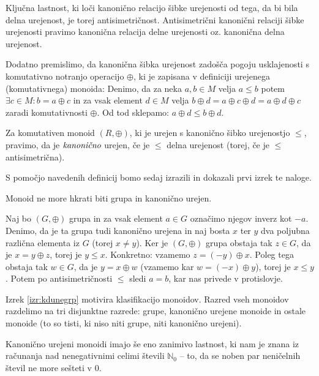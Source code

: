 \documentclass[mat1]{fmfdelo}
\newcommand{\N}{\mathbb{N}}
\newcommand{\No}{\N_0}
\newcommand{\pojem}[1]{\ensuremath{\emph{#1}}}
\begin{document}
Ključna lastnost, ki loči kanonično relacijo šibke urejenosti od tega, da bi bila delna urejenost, je torej antisimetričnost. Antisimetrični kanonični relaciji šibke urejenosti pravimo kanonična relacija delne urejenosti oz. kanonična delna urejenost.

Dodatno premislimo, da kanonična šibka urejenost zadošča pogoju usklajenosti s komutativno notranjo operacijo $\oplus$, ki je zapisana v definiciji urejenega (komutativnega) monoida: Denimo, da za neka $a, b\in M$ velja $a \leq b$ potem $\exists c\in M: b = a \oplus c$ in za vsak element $d\in M$ velja $b \oplus d = a \oplus c \oplus d = a \oplus d \oplus c$ zaradi komutativnosti $\oplus$. Od tod sklepamo: $a \oplus d \leq b \oplus d$.
	
\begin{definicija}
		Za komutativen monoid $(R, \oplus)$, ki je urejen s kanonično šibko urejenostjo $\leq$, pravimo, da je \pojem{kanonično} urejen, če je $\leq$ delna urejenost (torej, če je $\leq$ antisimetrična).
\end{definicija}
S pomočjo navedenih definicij bomo sedaj izrazili in dokazali prvi izrek te naloge.

\begin{izrek}
	\label{izr:kdunegrp}
	Monoid ne more hkrati biti grupa in kanonično urejen.
\end{izrek}
\begin{dokaz}
	Naj bo $(G, \oplus)$ grupa in za vsak element $a\in G$ označimo njegov inverz kot $-a$. Denimo, da je ta grupa tudi kanonično urejena in naj bosta $x$ ter $y$ dva poljubna različna elementa iz $G$ (torej $x\neq y$).
	Ker je $(G, \oplus)$ grupa obstaja tak $z\in G$, da je $x = y \oplus z$, torej je $y \leq x$. Konkretno: vzamemo $z = (-y)\oplus x$. Poleg tega obstaja tak $w\in G$, da je $y = x \oplus w$ (vzamemo kar $w = (-x)\oplus y$), torej je $x \leq y$. Potem po antisimetričnosti $\leq$ sledi $a = b$, kar nas privede v protislovje.
\end{dokaz}

\begin{opomba}
	Izrek \ref{izr:kdunegrp} motivira klasifikacijo monoidov. Razred vseh monoidov razdelimo na tri disjunktne razrede: grupe, kanonično urejene monoide in ostale monoide (to so tisti, ki niso niti grupe, niti kanonično urejeni).
\end{opomba}

Kanonično urejeni monoidi imajo še eno zanimivo lastnost, ki nam je znana iz računanja nad nenegativnimi celimi števili $\No$ -- to, da se noben par neničelnih števil ne more sešteti v $0$.
\end{document}

